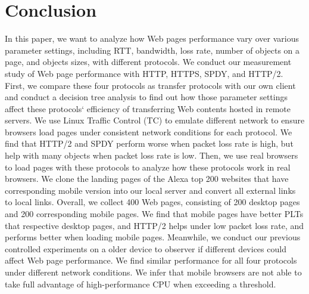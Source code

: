 \section{Conclusion}

In this paper, we want to analyze how Web pages performance vary over various parameter settings, including RTT, bandwidth, loss rate, number of objects on a page, and objects sizes, with different protocols. We conduct our measurement study of Web page performance with HTTP, HTTPS, SPDY, and HTTP/2. First, we compare these four protocols as transfer protocols with our own client and conduct a decision tree analysis to find out how those parameter settings affect these protocols` efficiency of transferring Web contents hosted in remote servers. We use Linux Traffic Control (TC) to emulate different network to ensure browsers load pages under consistent network conditions for each protocol. We find that HTTP/2 and SPDY perform worse when packet loss rate is high, but help with many objects when packet loss rate is low. Then, we use real browsers to load pages with these protocols to analyze how these protocols work in real browsers. We clone the landing pages of the Alexa top 200 websites that have corresponding mobile version into our local server and convert all external links to local links. Overall, we collect 400 Web pages, consisting of 200 desktop pages and 200 corresponding mobile pages. We find that mobile pages have better PLTs that respective desktop pages, and HTTP/2 helps under low packet loss rate, and performs better when loading mobile pages. Meanwhile, we conduct our previous controlled experiments on a older device to observer if different devices could affect Web page performance. We find similar performance for all four protocols under different network conditions. We infer that mobile browsers are not able to take full advantage of high-performance CPU when exceeding a threshold.